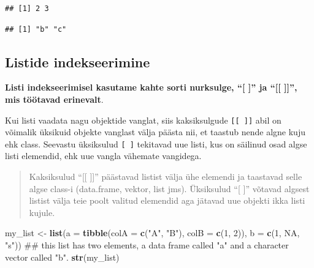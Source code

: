 \documentclass[]{book}
\newenvironment{Shaded}{\begin{snugshade}}{\end{snugshade}}
\newcommand{\KeywordTok}[1]{\textcolor[rgb]{0.13,0.29,0.53}{\textbf{#1}}}
\newcommand{\DataTypeTok}[1]{\textcolor[rgb]{0.13,0.29,0.53}{#1}}
\newcommand{\DecValTok}[1]{\textcolor[rgb]{0.00,0.00,0.81}{#1}}
\newcommand{\StringTok}[1]{\textcolor[rgb]{0.31,0.60,0.02}{#1}}
\newcommand{\CommentTok}[1]{\textcolor[rgb]{0.56,0.35,0.01}{\textit{#1}}}
\newcommand{\OtherTok}[1]{\textcolor[rgb]{0.56,0.35,0.01}{#1}}
\newcommand{\OperatorTok}[1]{\textcolor[rgb]{0.81,0.36,0.00}{\textbf{#1}}}
\newcommand{\NormalTok}[1]{#1}
\begin{document}
\begin{verbatim}
## [1] 2 3
\end{verbatim}

\begin{Shaded}
\end{Shaded}

\begin{verbatim}
## [1] "b" "c"
\end{verbatim}

\subsection{Listide indekseerimine}\label{listide-indekseerimine}

\textbf{Listi indekseerimisel kasutame kahte sorti nurksulge, ``{[}
{]}'' ja ``{[}{[} {]}{]}'', mis töötavad erinevalt}.

Kui listi vaadata nagu objektide vanglat, siis kaksiksulgude
\texttt{{[}{[}\ {]}{]}} abil on võimalik üksikuid objekte vanglast välja
päästa nii, et taastub nende algne kuju ehk class. Seevastu üksiksulud
\texttt{{[}\ {]}} tekitavad uue listi, kus on säilinud osad algse listi
elemendid, ehk uue vangla vähemate vangidega.

\begin{quote}
Kaksiksulud ``{[}{[} {]}{]}'' päästavad listist välja ühe elemendi ja
taastavad selle algse class-i (data.frame, vektor, list jms). Üksiksulud
``{[} {]}'' võtavad algsest listist välja teie poolt valitud elemendid
aga jätavad uue objekti ikka listi kujule.
\end{quote}

\begin{Shaded}
\begin{Highlighting}[]
\NormalTok{my_list <-}\StringTok{ }\KeywordTok{list}\NormalTok{(}\DataTypeTok{a =} \KeywordTok{tibble}\NormalTok{(}\DataTypeTok{colA =} \KeywordTok{c}\NormalTok{(}\StringTok{"A"}\NormalTok{, }\StringTok{"B"}\NormalTok{), }\DataTypeTok{colB =} \KeywordTok{c}\NormalTok{(}\DecValTok{1}\NormalTok{, }\DecValTok{2}\NormalTok{)), }\DataTypeTok{b =} \KeywordTok{c}\NormalTok{(}\DecValTok{1}\NormalTok{, }\OtherTok{NA}\NormalTok{, }\StringTok{"s"}\NormalTok{))}
\NormalTok{## this list has two elements, a data frame called "a" and a character vector called "b".}
\KeywordTok{str}\NormalTok{(my_list)}
\end{Highlighting}
\end{Shaded}
\end{document}
